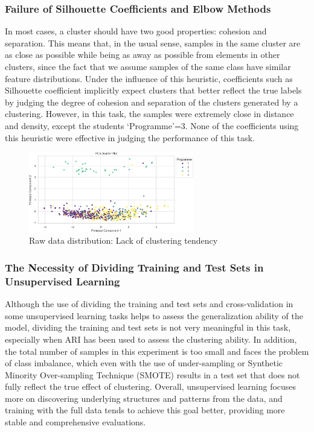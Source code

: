 \documentclass[journal]{IEEEtai}
\begin{document}
\subsubsection{\textbf{Failure of Silhouette Coefficients and Elbow Methods}}
In most cases, a cluster should have two good properties: cohesion and separation. This means that, in the usual sense, samples in the same cluster are as close as possible while being as away as possible from elements in other clusters, since the fact that we assume samples of the same class have similar feature distributions. Under the influence of this heuristic, coefficients such as Silhouette coefficient implicitly expect clusters that better reflect the true labels by judging the degree of cohesion and separation of the clusters generated by a clustering. However, in this task, the samples were extremely close in distance and density, except the students  `Programme'=3. None of the coefficients using this heuristic were effective in judging the performance of this  task.

\begin{figure}[htbp]
	\centerline{\includegraphics[width=17pc]{pca_7_features_in.png}}
	\caption{Raw data distribution: Lack of clustering tendency}
\end{figure}

\subsubsection{\textbf{The Necessity of Dividing Training and Test Sets in Unsupervised Learning}}
Although the use of dividing the training and test sets and cross-validation in some unsupervised learning tasks helps to assess the generalization ability of the model, dividing the training and test sets is not very meaningful in this task, especially when ARI has been used to assess the clustering ability. In addition, the total number of samples in this experiment is too small and faces the problem of class imbalance, which even with the use of under-sampling or Synthetic Minority Over-sampling Technique (SMOTE) results in a test set that does not fully reflect the true effect of clustering. Overall, unsupervised learning focuses more on discovering underlying structures and patterns from the data, and training with the full data tends to achieve this goal better, providing more stable and comprehensive evaluations.
\end{document}
